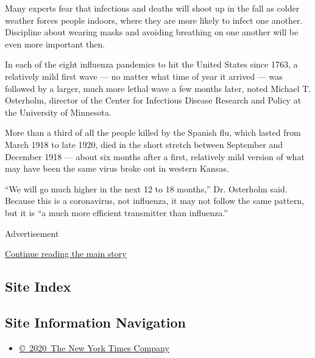 Many experts fear that infections and deaths will shoot up in the fall
as colder weather forces people indoors, where they are more likely to
infect one another. Discipline about wearing masks and avoiding
breathing on one another will be even more important then.

In each of the eight influenza pandemics to hit the United States since
1763, a relatively mild first wave --- no matter what time of year it
arrived --- was followed by a larger, much more lethal wave a few months
later, noted Michael T. Osterholm, director of the Center for Infectious
Disease Research and Policy at the University of Minnesota.

More than a third of all the people killed by the Spanish flu, which
lasted from March 1918 to late 1920, died in the short stretch between
September and December 1918 --- about six months after a first,
relatively mild version of what may have been the same virus broke out
in western Kansas.

``We will go much higher in the next 12 to 18 months,'' Dr. Osterholm
said. Because this is a coronavirus, not influenza, it may not follow
the same pattern, but it is ``a much more efficient transmitter than
influenza.''

Advertisement

\protect\hyperlink{after-bottom}{Continue reading the main story}

\hypertarget{site-index}{%
\subsection{Site Index}\label{site-index}}

\hypertarget{site-information-navigation}{%
\subsection{Site Information
Navigation}\label{site-information-navigation}}

\begin{itemize}
\tightlist
\item
  \href{https://help.nytimes3xbfgragh.onion/hc/en-us/articles/115014792127-Copyright-notice}{©~2020~The
  New York Times Company}
\end{itemize}


